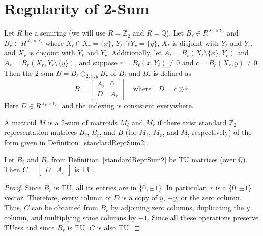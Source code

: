 \chapter{Regularity of 2-Sum}

\begin{definition}
    \label{standardReprSum2}
    \leanok
    Let $R$ be a semiring (we will use $R = \mathbb{Z}_{2}$ and $R = \mathbb{Q}$). Let $B_{\ell} \in R^{X_{\ell} \times Y_{\ell}}$ and $B_{r} \in R^{X_{r} \times Y_{r}}$ where $X_{\ell} \cap X_{r} = \{x\}$, $Y_{\ell} \cap Y_{r} = \{y\}$, $X_{\ell}$ is disjoint with $Y_{\ell}$ and $Y_{r}$, and $X_{r}$ is disjoint with $Y_{\ell}$ and $Y_{r}$. Additionally, let $A_{\ell} = B_{\ell} (X_{\ell} \setminus \{x\}, Y_{\ell})$ and $A_{r} = B_{r} (X_{r}, Y_{r} \setminus \{y\})$, and suppose $r = B_{\ell} (x, Y_{\ell}) \neq 0$ and $c = B_{r} (X_{r}, y) \neq 0$. Then the $2$-sum $B = B_{\ell} \oplus_{2, x, y} B_{r}$ of $B_{\ell}$ and $B_{r}$ is defined as
    \[
        B = \begin{bmatrix} A_{\ell} & 0 \\ D & A_{r} \end{bmatrix}
        \quad \text{where} \quad
        D = c \otimes r.
    \]
    Here $D \in R^{X_{r} \times Y_{\ell}}$, and the indexing is consistent everywhere.
\end{definition}

\begin{definition}
    \label{Matroid.Is2sumOf}
    \leanok
    A matroid $M$ is a $2$-sum of matroids $M_{\ell}$ and $M_{r}$ if there exist standard $\mathbb{Z}_{2}$ representation matrices $B_{\ell}$, $B_{r}$, and $B$ (for $M_{\ell}$, $M_{r}$, and $M$, respectively) of the form given in Definition~\ref{standardReprSum2}.
\end{definition}

\begin{lemma}
    \label{Matrix.IsTotallyUnimodular.fromCols_outer}
    \leanok
    Let $B_{\ell}$ and $B_{r}$ from Definition~\ref{standardReprSum2} be TU matrices (over $\mathbb{Q}$). Then $C = \begin{bmatrix} D & A_{r} \end{bmatrix}$ is TU.
\end{lemma}

\begin{proof}
    \leanok
    Since $B_{\ell}$ is TU, all its entries are in $\{0, \pm 1\}$. In particular, $r$ is a $\{0, \pm 1\}$ vector. Therefore, every column of $D$ is a copy of $y$, $-y$, or the zero column. Thus, $C$ can be obtained from $B_{r}$ by adjoining zero columns, duplicating the $y$ column, and multiplying some columns by $-1$. Since all these operations preserve TUess and since $B_{r}$ is TU, $C$ is also TU.
\end{proof}

